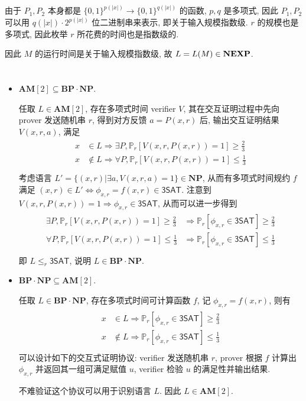 \documentclass[8pt]{article}
\theoremstyle{compact}
\def\le{\leqslant}
\def\ge{\geqslant}
\begin{document}
由于 $P_1, P_2$ 本身都是 $\{0, 1\}^{p(|x|)} \to \{0, 1\}^{q(|x|)}$ 的函数, $p, q$ 是多项式, 因此 $P_1, P_2$ 可以用 $q(|x|) \cdot 2^{p(|x|)}$ 位二进制串来表示, 即关于输入规模指数级. $r$ 的规模也是多项式, 因此枚举 $r$ 所花费的时间也是指数级的.

因此 $M$ 的运行时间是关于输入规模指数级, 故 $L = L(M) \in \textbf{NEXP}$.

\def\AM{\textbf{AM}}
\def\BPNP{\textbf{BP}\cdot\textbf{NP}}
\def\NP{\textbf{NP}}
\section{}

\begin{itemize}
	\item $\AM[2] \subseteq \BPNP$.
	
	任取 $L \in \AM[2]$, 存在多项式时间 verifier $V$, 其在交互证明过程中先向 prover 发送随机串 $r$, 得到对方反馈 $a = P(x, r)$ 后, 输出交互证明结果 $V(x, r, a)$, 满足 \begin{align*}
		\begin{split}
			x &\in L \Rightarrow \exists P, \mathbb P_r[V(x, r, P(x, r)) = 1] \ge \frac23 \\
			x &\notin L \Rightarrow \forall P, \mathbb P_r[V(x, r, P(x, r)) = 1] \le \frac13 \\
		\end{split}
	\end{align*}
	考虑语言 $L' = \{(x, r) | \exists a, V(x, r, a) = 1\} \in \NP$, 从而有多项式时间规约 $f$ 满足 $(x, r) \in L' \Leftrightarrow \phi_{x, r} = f(x, r) \in \textsf{3SAT}$. 注意到 $V(x, r, P(x, r)) = 1 \Rightarrow \phi_{x, r} \in \textsf{3SAT}$, 从而可以进一步得到 \begin{align*}
		\begin{split}
			\exists P, \mathbb P_r[V(x, r, P(x, r)) = 1] \ge \frac23 & \Rightarrow \mathbb P_r[\phi_{x, r} \in \textsf{3SAT}] \ge \frac23\\
			\forall P, \mathbb P_r[V(x, r, P(x, r)) = 1] \le \frac13 & \Rightarrow \mathbb P_r[\phi_{x, r} \in \textsf{3SAT}] \le \frac13\\
		\end{split}
	\end{align*}
	即 $L \le_r \textsf{3SAT}$, 说明 $L \in \BPNP$.

	\item $\BPNP \subseteq \AM[2]$.
	
	任取 $L \in \BPNP$, 存在多项式时间可计算函数 $f$, 记 $\phi_{x, r} = f(x, r)$, 则有 \begin{align*}
		\begin{split}
			x &\in L \Rightarrow \mathbb P_r[\phi_{x, r} \in \textsf{3SAT}] \ge \frac23 \\
			x &\notin L \Rightarrow \mathbb P_r[\phi_{x, r} \in \textsf{3SAT}] \le \frac13 \\
		\end{split}
	\end{align*} 可以设计如下的交互式证明协议: verifier 发送随机串 $r$, prover 根据 $f$ 计算出 $\phi_{x, r}$ 并返回其一组可满足赋值 $u$, verifier 检验 $u$ 的满足性并输出结果.

	不难验证这个协议可以用于识别语言 $L$. 因此 $L \in \AM[2]$.

\end{itemize}
\end{document}
